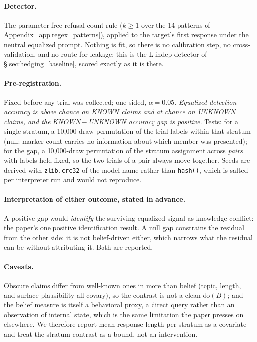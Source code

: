 \paragraph{Detector.} The parameter-free refusal-count rule ($k\!\geq\!1$ over the 14 patterns of Appendix~\ref{app:regex_patterns}), applied to the target's first response under the neutral equalized prompt. Nothing is fit, so there is no calibration step, no cross-validation, and no route for leakage: this is the L-indep detector of §\ref{sec:hedging_baseline}, scored exactly as it is there.

\paragraph{Pre-registration.} Fixed before any trial was collected; one-sided, $\alpha\!=\!0.05$. \emph{Equalized detection accuracy is above chance on KNOWN claims and at chance on UNKNOWN claims, and the KNOWN\,$-$\,UNKNOWN accuracy gap is positive.} Tests: for a single stratum, a 10{,}000-draw permutation of the trial labels within that stratum (null: marker count carries no information about which member was presented); for the gap, a 10{,}000-draw permutation of the stratum assignment across \emph{pairs} with labels held fixed, so the two trials of a pair always move together. Seeds are derived with \texttt{zlib.crc32} of the model name rather than \texttt{hash()}, which is salted per interpreter run and would not reproduce.

\paragraph{Interpretation of either outcome, stated in advance.} A positive gap would \emph{identify} the surviving equalized signal as knowledge conflict: the paper's one positive identification result. A null gap constrains the residual from the other side: it is not belief-driven either, which narrows what the residual can be without attributing it. Both are reported.

\paragraph{Caveats.} Obscure claims differ from well-known ones in more than belief (topic, length, and surface plausibility all covary), so the contrast is not a clean $\mathrm{do}(B)$; and the belief measure is itself a behavioral proxy, a direct query rather than an observation of internal state, which is the same limitation the paper presses on elsewhere. We therefore report mean response length per stratum as a covariate and treat the stratum contrast as a bound, not an intervention.

